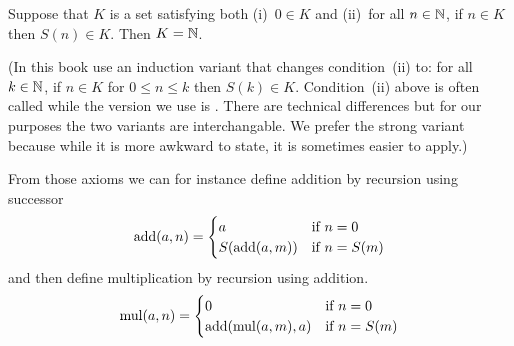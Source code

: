 \documentclass{ibl}
\begin{document}
\begin{ax}[Induction]
  Suppose that $K$ is a set satisfying both (i)~$0\in K$
  and (ii)~for all $n\in\mathbb{N}$, if $n\in K$ then $S(n)\in K$.
  Then $K=\mathbb{N}$.
\end{ax}

\noindent (In this book use an induction variant that changes
condition~(ii) to: for all $k\in\mathbb{N}$,  
if $n\in K$ for $0\leq n\leq k$ then $S(k)\in K$.
Condition~(ii) above is often called  while
the version we use is .
There are technical differences but for our purposes
the two variants are interchangable. 
We prefer the strong variant because while it is 
more awkward to state, it is sometimes easier to apply.)

From those axioms we can for instance 
define addition by recursion using successor
\begin{equation*}
  \operatorname{add}(a,n)=
  \begin{cases}
    a             &\text{if $n=0$}  \\
    S(\operatorname{add}(a,m))  &\text{if $n=S(m)$} 
  \end{cases}
\end{equation*}
and then define multiplication by recursion using addition.
\begin{equation*}
  \operatorname{mul}(a,n)=
  \begin{cases}
    0             &\text{if $n=0$}  \\
    \operatorname{add}(\operatorname{mul}(a,m),a)  &\text{if $n=S(m)$} 
  \end{cases}
\end{equation*}
\end{document}
